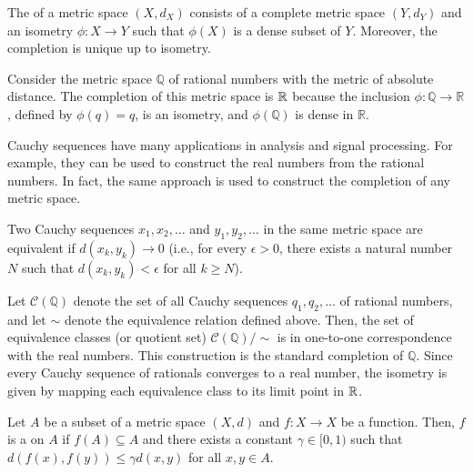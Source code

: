 \begin{definition}
The  of a metric space $(X,d_X)$ consists of a complete metric space $(Y,d_Y)$ and an isometry $\phi  \colon X \rightarrow Y$ such that $\phi(X)$ is a dense subset of $Y$.
Moreover, the completion is unique up to isometry.
\end{definition}

\begin{example}
Consider the metric space $\mathbb{Q}$ of rational numbers with the metric of absolute distance.
The completion of this metric space is $\mathbb{R}$ because the inclusion $\phi\colon \mathbb Q \to \mathbb R$, defined by $\phi(q)=q$, is an isometry, and $\phi(\mathbb Q)$ is dense in $\mathbb R$.
\end{example}

Cauchy sequences have many applications in analysis and signal processing.
For example, they can be used to construct the real numbers from the rational numbers.
In fact, the same approach is used to construct the completion of any metric space.

\begin{definition}
Two Cauchy sequences $x_1, x_2, \ldots$ and $y_1, y_2, \ldots$ in the same metric space are equivalent if $d(x_k,y_k)\to0$ (i.e., for every $\epsilon >0$, there exists a natural number $N$ such that $d (x_k, y_k) < \epsilon$ for all $k \geq N$).
\end{definition}

\begin{example}
Let $\mathcal C(\mathbb Q)$ denote the set of all Cauchy sequences $q_1, q_2, \ldots$ of rational numbers, and let $\sim$ denote the equivalence relation defined above.
Then, the set of equivalence classes (or quotient set) $\mathcal{C}(\mathbb{Q}) / \! \sim$ is in one-to-one correspondence with the real numbers.
This construction is the standard completion of $\mathbb{Q}$.
Since every Cauchy sequence of rationals converges to a real number, the isometry is given by mapping each equivalence class to its limit point in $\mathbb{R}$.
\end{example}

\begin{definition}
Let $A$ be a subset of a metric space $(X,d)$ and $f \colon X \rightarrow X$ be a function.
Then, $f$ is a  on $A$ if $f(A) \subseteq A$ and there exists a constant $\gamma \in [0,1)$ such that $d \left( f(x),f(y) \right) \leq \gamma  d(x,y)$ for all $x,y\in A$.
\end{definition}

